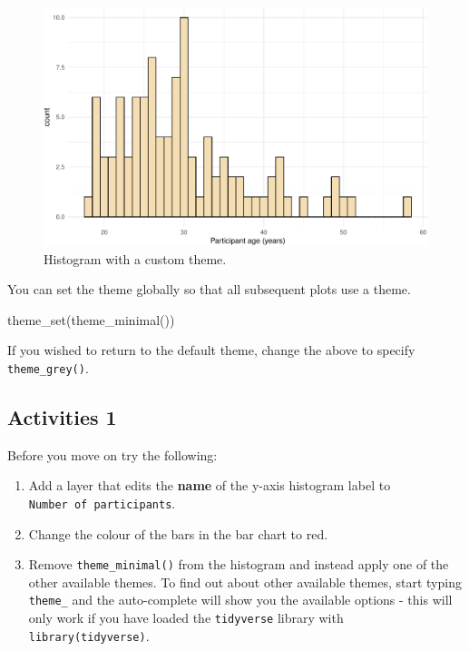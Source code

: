 \documentclass[
  english,
  doc,floatsintext]{apa6}
\newenvironment{Shaded}{\begin{snugshade}}{\end{snugshade}}
\newcommand{\FunctionTok}[1]{\textcolor[rgb]{0.00,0.00,0.00}{#1}}
\newcommand{\NormalTok}[1]{#1}
\begin{document}
\begin{figure}

{\centering \includegraphics[width=1\linewidth]{images/histogram-theme-1} 

}

\caption{Histogram with a custom theme.}\label{fig:histogram-theme}
\end{figure}

You can set the theme globally so that all subsequent plots use a theme.

\begin{Shaded}
\begin{Highlighting}[]
\FunctionTok{theme\_set}\NormalTok{(}\FunctionTok{theme\_minimal}\NormalTok{())}
\end{Highlighting}
\end{Shaded}

If you wished to return to the default theme, change the above to specify \texttt{theme\_grey()}.

\hypertarget{activities-1}{%
\subsection{Activities 1}\label{activities-1}}

Before you move on try the following:

\begin{enumerate}
\def\labelenumi{\arabic{enumi}.}
\item
  Add a layer that edits the \textbf{name} of the y-axis histogram label to \texttt{Number\ of\ participants}.
\item
  Change the colour of the bars in the bar chart to red.
\item
  Remove \texttt{theme\_minimal()} from the histogram and instead apply one of the other available themes. To find out about other available themes, start typing \texttt{theme\_} and the auto-complete will show you the available options - this will only work if you have loaded the \texttt{tidyverse} library with \texttt{library(tidyverse)}.
\end{enumerate}
\end{document}
